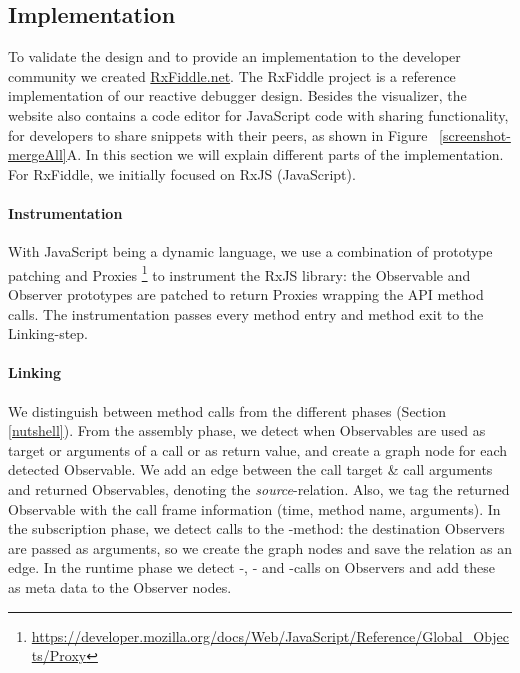 \subsection{Implementation} To validate the design and to provide an
implementation to the developer community we created \url{RxFiddle.net}.
The RxFiddle project is a reference implementation of our reactive
debugger design.  Besides the visualizer, the website also contains a
code editor for JavaScript code with sharing functionality, for
developers to share snippets with their peers, as shown in Figure~%
\ref{screenshot-mergeAll}A.  In this section we will explain different
parts of the implementation.  For RxFiddle, we initially focused on RxJS
(JavaScript).

\paragraph{Instrumentation} With JavaScript being a dynamic language, we
use a combination of prototype patching and Proxies%
\footnote{\url{https://developer.mozilla.org/docs/Web/JavaScript/Reference/Global_Objects/Proxy}}
to instrument the RxJS library:  the Observable and Observer prototypes
are patched to return Proxies wrapping the API method calls.  The
instrumentation passes every method entry and method exit to the
Linking-step.

\paragraph{Linking} We distinguish between method calls from the
different phases (Section~%
\ref{nutshell}).  From the assembly phase, we detect when Observables
are used as target or arguments of a call or as return value, and create
a graph node for each detected Observable.  We add an edge between the
call target \& call arguments and returned Observables, denoting the
\emph{source}-relation.  Also, we tag the returned Observable with the
call frame information (time, method name, arguments).  In the
subscription phase, we detect calls to the -method:  the
destination Observers are passed as arguments, so we create the graph
nodes and save the relation as an edge.  In the runtime phase we detect
-, - and -calls on Observers and add
these as meta data to the Observer nodes.

\vspace{-1mm}

